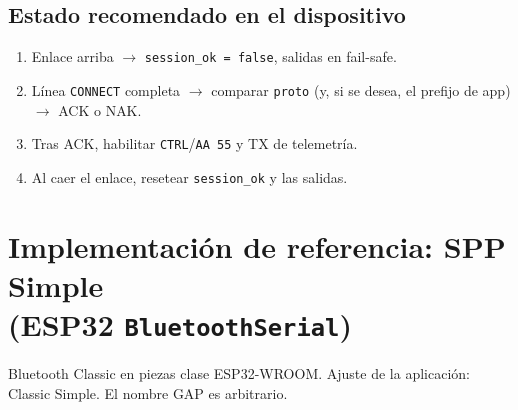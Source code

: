 \documentclass[12pt,a4paper]{article}
\begin{document}
\subsection{Estado recomendado en el dispositivo}

\begin{enumerate}[leftmargin=1.6cm]
  \item Enlace arriba $\rightarrow$ \texttt{session\_ok = false}, salidas
        en fail-safe.
  \item Línea \texttt{CONNECT} completa $\rightarrow$ comparar \texttt{proto}
        (y, si se desea, el prefijo de app) $\rightarrow$ ACK o NAK.
  \item Tras ACK, habilitar \texttt{CTRL}/\texttt{AA 55} y TX de telemetría.
  \item Al caer el enlace, resetear \texttt{session\_ok} y las salidas.
\end{enumerate}

\section{\texorpdfstring{Implementación de referencia: SPP Simple\\[0.15em](ESP32 \texttt{BluetoothSerial})}{Implementación de referencia: SPP Simple (ESP32 BluetoothSerial)}}
\label{sec:code-esp32}

Bluetooth Classic en piezas clase ESP32-WROOM.
Ajuste de la aplicación: Classic Simple.
El nombre GAP es arbitrario.
\end{document}
